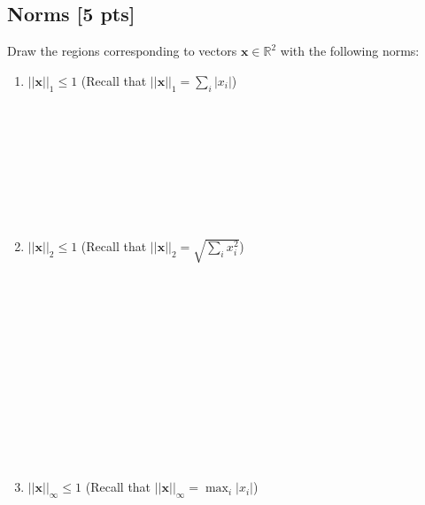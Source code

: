 \documentclass[a4paper]{article}
\theoremstyle{definition}
\newcommand{\RR}{\mathbb{R}}
\newenvironment{soln}{
	\leavevmode\color{blue}\ignorespaces
}{}
\begin{document}
	\subsection{Norms [5 pts]}
	Draw the regions corresponding to vectors $\mathbf{x}\in\RR^2$ with the following norms:
	\begin{enumerate}
		\item 	$||\mathbf{x}||_1\leq 1$ (Recall that $||\mathbf{x}||_1 = \sum_i |x_i|$)

	\begin{soln}
	   \\
	   \\
	   \\
	   \\
	   \\
	   \\
	   \\
	\end{soln}
		
		\item 	$||\mathbf{x}||_2 \leq 1$ (Recall that $||\mathbf{x}||_2 =\sqrt{\sum_i x_i^2}$)
		\begin{soln}
			\\
			\\
			\\
			\\
			\\
			\\
			\\
			\\
			\\
			\\
			\\
		 \end{soln}
		\item 	$||\mathbf{x}||_\infty \leq 1$ (Recall that $||\mathbf{x}||_\infty = \max_i |x_i|$)
			\begin{soln}
				\\
				\\
				\\
				\\
				\\
				\\
				\\
				\\
				\\
				\\
				\\
			\end{soln}
	\end{enumerate}
	
\end{document}
